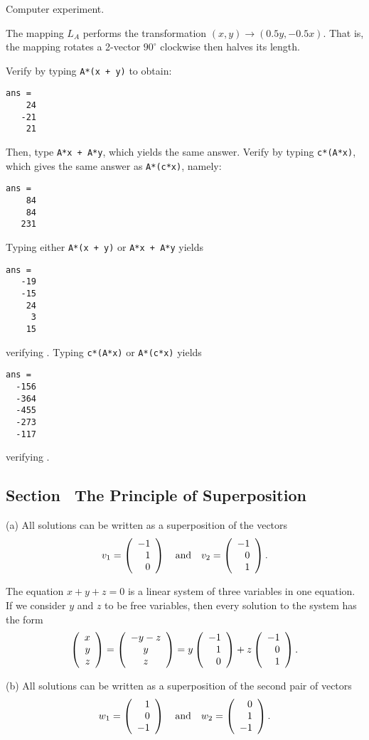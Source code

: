   Computer experiment.

The mapping $L_A$ performs the transformation $(x,y) \rightarrow
(0.5y, -0.5x)$.  That is, the mapping rotates a 2-vector
$90^\circ$ clockwise then halves its length.

 Verify  by typing {\tt A*(x + y)} to obtain:
\begin{verbatim}
ans =
    24
   -21
    21
\end{verbatim}
Then, type {\tt A*x + A*y}, which yields the same answer.
Verify  by typing {\tt c*(A*x)}, which gives
the same answer as {\tt A*(c*x)}, namely:
\begin{verbatim}
ans =
    84
    84
   231
\end{verbatim}

 Typing either {\tt A*(x + y)} or {\tt A*x + A*y} yields
\begin{verbatim}
ans =
   -19
   -15
    24
     3
    15
\end{verbatim}
verifying .  Typing {\tt c*(A*x)} or {\tt A*(c*x)} yields
\begin{verbatim}
ans =
  -156
  -364
  -455
  -273
  -117
\end{verbatim}
verifying .



\subsection*{Section~\protect{\ref{S:Superposition}} The Principle of
Superposition}

(a) \ans All solutions can be written as a superposition of the vectors
\[
v_1 = \left(\begin{array}{r} -1 \\ 1 \\ 0\end{array}\right) \quad\mbox{and}\quad v_2 = \left(\begin{array}{r} -1 \\ 0 \\ 1\end{array}\right).
\]

\soln The equation $x + y + z = 0$ is a linear system of three variables
in one equation.  If we consider $y$ and $z$ to be free variables, then
every solution to the system has the form
\[
\left(\begin{array}{r} x \\ y \\ z\end{array}\right) = \left(\begin{array}{c} -y - z \\ y \\
z \end{array}\right) = y\left(\begin{array}{r} -1 \\ 1 \\ 0\end{array}\right) +
z\left(\begin{array}{r} -1 \\ 0 \\ 1\end{array}\right).
\]

(b) \ans All solutions can be written as a superposition
of the second pair of vectors
\[
w_1 = \left(\begin{array}{r} 1 \\ 0 \\ -1\end{array}\right) \quad\mbox{and}\quad w_2 = \left(\begin{array}{r} 0 \\ 1 \\ -1\end{array}\right).
\]

